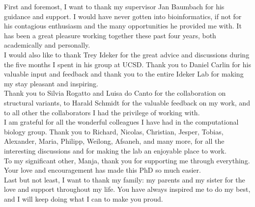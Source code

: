 First and foremost, I want to thank my supervisor Jan Baumbach for his guidance and support. I would have never gotten into bioinformatics, if not for his contagious enthusiasm and the many opportunities he provided me with.
It has been a great pleasure working together these past four years, both academically and personally.\\[1em]
I would also like to thank Trey Ideker for the great advice and discussions during the five months I spent in his group at UCSD. Thank you to Daniel Carlin for his valuable input and feedback and thank you to the entire Ideker Lab for making my stay pleasant and inspiring.\\[1em]
Thank you to Silvia Rogatto and Luisa do Canto for the collaboration on structural variants, to Harald Schmidt for the valuable feedback on my work, and to all other the collaborators I had the privilege of working with.\\[1em]
I am grateful for all the wonderful colleagues I have had in the computational biology group. Thank you to Richard, Nicolas, Christian, Jesper, Tobias, Alexander, Maria, Philipp, Weilong, Afsaneh, and many more, for all the interesting discussions and for making the lab an enjoyable place to work.\\[1em]
To my significant other, Manja, thank you for supporting me through everything. Your love and encouragement has made this PhD so much easier.\\[1em]
Last but not least, I want to thank my family: my parents and my sister for the love and support throughout my life. You have always inspired me to do my best, and I will keep doing what I can to make you proud.
